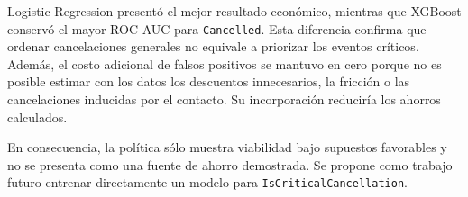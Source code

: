 Logistic Regression presentó el mejor resultado económico, mientras que
XGBoost conservó el mayor ROC AUC para \texttt{Cancelled}. Esta diferencia
confirma que ordenar cancelaciones generales no equivale a priorizar los
eventos críticos. Además, el costo adicional de falsos positivos se mantuvo en
cero porque no es posible estimar con los datos los descuentos innecesarios,
la fricción o las cancelaciones inducidas por el contacto. Su incorporación
reduciría los ahorros calculados.

En consecuencia, la política sólo muestra viabilidad bajo supuestos favorables
y no se presenta como una fuente de ahorro demostrada. Se propone como trabajo
futuro entrenar directamente un modelo para
\texttt{IsCriticalCancellation}.
